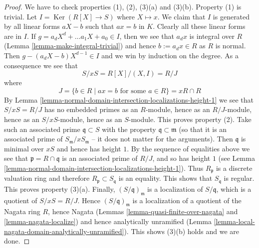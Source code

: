 \documentclass[10pt,a4paper]{amsart}
\theoremstyle{plain}
\theoremstyle{definition}
\theoremstyle{remark}
\numberwithin{equation}{subsection}
\def\Ker{\mathop{\mathrm{Ker}}}
\begin{document}
\begin{proof}
\medskip\noindent
We have to check properties (1), (2), (3)(a) and (3)(b).
Property (1) is trivial.
Let $I = \Ker(R[X] \to S)$ where $X \mapsto x$.
We claim that $I$ is generated by all linear forms $aX - b$ such that
$ax = b$ in $K$. Clearly all these linear forms are in $I$.
If $g = a_d X^d + \ldots a_1 X + a_0 \in I$, then we see that
$a_dx$ is integral over $R$ (Lemma \ref{lemma-make-integral-trivial})
and hence $b := a_dx \in R$
as $R$ is normal. Then $g - (a_dX - b)X^{d - 1} \in I$ and we win by
induction on the degree. As a consequence we see that
$$
S/xS = R[X]/(X, I) = R/J
$$
where
$$
J = \{b \in R \mid ax = b \text{ for some }a \in R\} = xR \cap R
$$
By Lemma \ref{lemma-normal-domain-intersection-localizations-height-1}
we see that $S/xS = R/J$ has no embedded primes as an $R$-module, hence as
an $R/J$-module, hence as an $S/xS$-module, hence as an $S$-module.
This proves property (2).
Take such an associated prime $\mathfrak q \subset S$ with the
property $\mathfrak q \subset \mathfrak m$ (so that it is an
associated prime of $S_{\mathfrak m}/xS_{\mathfrak m}$ -- it does not
matter for the arguments).
Then $\mathfrak q$ is minimal over $xS$ and hence has height $1$.
By the sequence of equalities above we see that
$\mathfrak p = R \cap \mathfrak q$ is an associated
prime of $R/J$, and so has height $1$
(see Lemma \ref{lemma-normal-domain-intersection-localizations-height-1}).
Thus $R_{\mathfrak p}$ is a discrete valuation ring and therefore
$R_{\mathfrak p} \subset S_{\mathfrak q}$ is an equality. This shows
that $S_{\mathfrak q}$ is regular. This proves property (3)(a).
Finally, $(S/\mathfrak q)_{\mathfrak m}$ is a localization
of $S/\mathfrak q$, which is a quotient of $S/xS = R/J$.
Hence $(S/\mathfrak q)_{\mathfrak m}$ is a localization of
a quotient of the Nagata ring $R$, hence
Nagata (Lemmas \ref{lemma-quasi-finite-over-nagata}
and \ref{lemma-nagata-localize})
and hence analytically unramified
(Lemma \ref{lemma-local-nagata-domain-analytically-unramified}).
This shows (3)(b) holds and we are done.
\end{proof}



\end{document}
